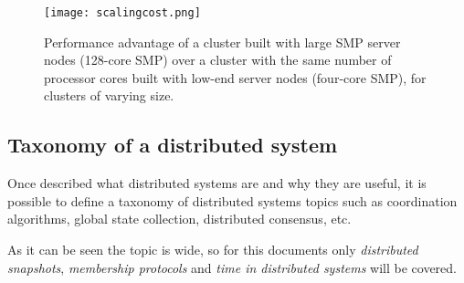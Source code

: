 \begin{figure}[!h]
\begin{center}
\texttt{[image: scalingcost.png]}
\caption{Performance advantage of a cluster built with large SMP server nodes
  (128-core SMP) over a cluster with the same number of processor cores built
  with low-end server nodes (four-core SMP), for clusters of varying
  size.\cite{Datacenter}}
\label{fig:highend}
\end{center}
\end{figure}

\subsection{Taxonomy of a distributed system}

Once described what distributed systems are and why they are useful, it is
possible to define a taxonomy of distributed systems topics such as coordination
algorithms, global state collection, distributed consensus, etc.

As it can be seen the topic is wide, so for this documents only
\textit{distributed snapshots}, \textit{membership protocols} and \textit{time
  in distributed systems} will be covered.

